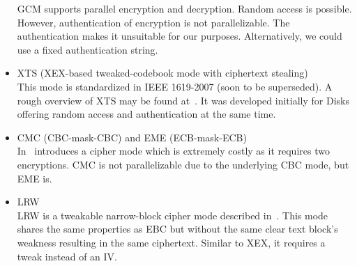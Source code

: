 \begin{itemize}
	GCM supports parallel encryption and decryption. Random access is possible. However, authentication of encryption is not parallelizable. The authentication makes it unsuitable for our purposes. Alternatively, we could use a fixed authentication string.
	\item XTS (XEX-based tweaked-codebook mode with ciphertext stealing)\\
	This mode is standardized in IEEE 1619-2007 (soon to be superseded). A rough overview of XTS may be found at~\cite{Martin2010}. It was developed initially for Disks offering random access and authentication at the same time. 
	\item CMC (CBC-mask-CBC) and EME (ECB-mask-ECB)\\ 
	In~\cite{Halevi:2003} \citeauthor{Halevi:2003} introduces a cipher mode which is extremely costly as it requires two encryptions. CMC is not parallelizable due to the underlying CBC mode, but EME is. 
	\item LRW\\
	LRW is a tweakable narrow-block cipher mode described in~\cite{tschorsch:translayeranon}. This mode shares the same properties as EBC but without the same clear text block's weakness resulting in the same ciphertext. Similar to XEX, it requires a tweak instead of an IV.
\end{itemize}

